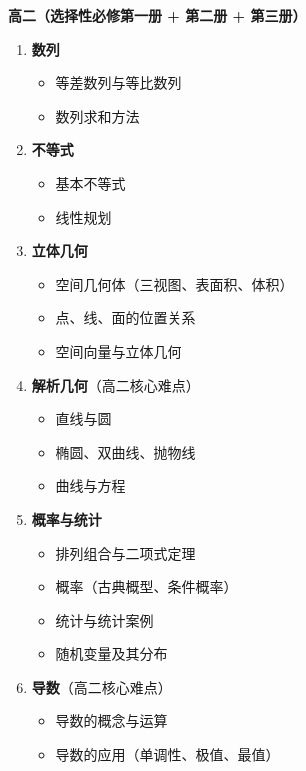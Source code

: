 \documentclass[12pt, a4paper]{ctexart}
\begin{document}
\begin{knowledgebox}
\vspace{8pt}
\textbf{高二（选择性必修第一册 + 第二册 + 第三册）}
\begin{enumerate}[label=\textbf{\arabic*.}, leftmargin=2.5em]
  \item \textbf{数列}
    \begin{itemize}
      \item 等差数列与等比数列
      \item 数列求和方法
    \end{itemize}
  \item \textbf{不等式}
    \begin{itemize}
      \item 基本不等式
      \item 线性规划
    \end{itemize}
  \item \textbf{立体几何}
    \begin{itemize}
      \item 空间几何体（三视图、表面积、体积）
      \item 点、线、面的位置关系
      \item 空间向量与立体几何
    \end{itemize}
  \item \textbf{解析几何}（高二核心难点）
    \begin{itemize}
      \item 直线与圆
      \item 椭圆、双曲线、抛物线
      \item 曲线与方程
    \end{itemize}
  \item \textbf{概率与统计}
    \begin{itemize}
      \item 排列组合与二项式定理
      \item 概率（古典概型、条件概率）
      \item 统计与统计案例
      \item 随机变量及其分布
    \end{itemize}
  \item \textbf{导数}（高二核心难点）
    \begin{itemize}
      \item 导数的概念与运算
      \item 导数的应用（单调性、极值、最值）
    \end{itemize}
\end{enumerate}


\end{knowledgebox}
\end{document}
